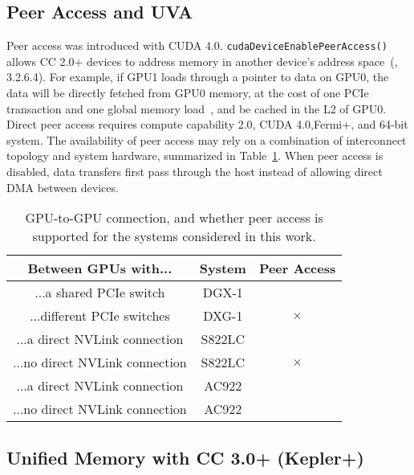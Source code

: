 \subsection{Peer Access and UVA}
\label{sec:cuda-peer}



Peer access was introduced with CUDA 4.0.
\texttt{cudaDeviceEnablePeerAccess()} allows CC 2.0+ devices to address memory in another device's address space~(\cite{nvidia2011cudac40}, 3.2.6.4).
For example, if GPU1 loads through a pointer to data on GPU0, the data will be directly fetched from GPU0 memory, at the cost of one PCIe transaction and one global memory load~\cite{schroeder2011peer}, and be cached in the L2 of GPU0.
Direct peer access requires compute capability 2.0, CUDA 4.0,Fermi+, and 64-bit system.
The availability of peer access may rely on a combination of interconnect topology and system hardware, summarized in Table~\ref{tab:cuda-peer-topology}.
When peer access is disabled, data transfers first pass through the host instead of allowing direct DMA between devices.

\begin{table}[ht]
	\centering
	\caption[System support for GPU-GPU Peer Access]{
		GPU-to-GPU connection, and whether peer access is supported for the systems considered in this work.
	}
	\label{tab:cuda-peer-topology}
	\begin{tabular}{ccc}
		\hline
		\textbf{Between GPUs with...}  & \textbf{System} &  \textbf{Peer Access} \\ \hline
		...a shared PCIe switch        & DGX-1           &  \checkmark           \\ \hline
		...different PCIe switches     & DXG-1           &  $\times$             \\ \hline
		...a direct NVLink connection  & S822LC          &  \checkmark           \\ \hline
		...no direct NVLink connection & S822LC          &  $\times$             \\ \hline
		...a direct NVLink connection  & AC922           &  \checkmark           \\ \hline
		...no direct NVLink connection & AC922           &  \checkmark           \\ \hline

	\end{tabular}
\end{table}

\subsection{Unified Memory with CC 3.0+ (Kepler+)}
\label{sec:unified-cc3}


